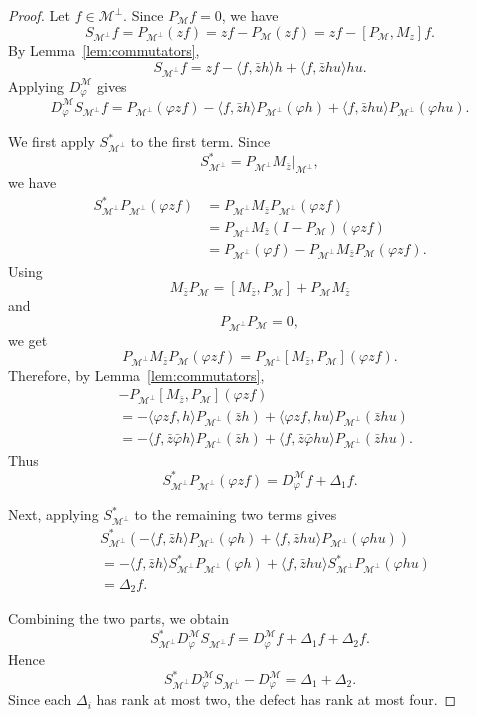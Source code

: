 \documentclass[12pt]{amsart}
\theoremstyle{definition}
\theoremstyle{remark}
\newcommand{\clm}{\mathcal{M}}
\newcommand{\vp}{\varphi}
\numberwithin{equation}{section}
\begin{document}
\begin{proof}
Let $f\in\clm^\perp$. Since $P_\clm f=0$, we have
\[
S_{\clm^\perp}f = P_{\clm^\perp}(zf)
= zf-P_\clm(zf) = zf-[P_\clm,M_z]f.
\]
By Lemma~\ref{lem:commutators},
\[
S_{\clm^\perp}f =
zf - \langle f,\bar{z} h\rangle h
+ \langle f,\bar{z} hu\rangle hu.
\]
Applying $D_\vp^\clm$ gives
\[
D_\vp^\clm S_{\clm^\perp}f
=
P_{\clm^\perp}(\vp zf)
-
\langle f,\bar{z} h\rangle P_{\clm^\perp}(\vp h)
+
\langle f,\bar{z} hu\rangle P_{\clm^\perp}(\vp hu).
\]

We first apply $S_{\clm^\perp}^*$ to the first term. Since
\[
S_{\clm^\perp}^*
=
P_{\clm^\perp}M_{\bar{z}}\big|_{\clm^\perp},
\]
we have
\begin{align*}
S_{\clm^\perp}^*P_{\clm^\perp}(\vp zf)
&=
P_{\clm^\perp}M_{\bar{z}}P_{\clm^\perp}(\vp zf) \\
&=
P_{\clm^\perp}M_{\bar{z}}(I-P_\clm)(\vp zf) \\
&=
P_{\clm^\perp}(\vp f)
-
P_{\clm^\perp}M_{\bar{z}}P_\clm(\vp zf).
\end{align*}
Using
\[
M_{\bar{z}}P_\clm
=
[M_{\bar{z}},P_\clm]+P_\clm M_{\bar{z}}
\]
and
\[
P_{\clm^\perp}P_\clm=0,
\]
we get
\[
P_{\clm^\perp}M_{\bar{z}}P_\clm(\vp zf)
=
P_{\clm^\perp}[M_{\bar{z}},P_\clm](\vp zf).
\]
Therefore, by Lemma~\ref{lem:commutators},
\begin{align*}
&-P_{\clm^\perp}[M_{\bar{z}},P_\clm](\vp zf) \\
&=
-
\langle \vp zf,h\rangle P_{\clm^\perp}(\bar{z} h)
+
\langle \vp zf,hu\rangle P_{\clm^\perp}(\bar{z} hu) \\
&=
-
\langle f,\bar{z}\bar\vp h\rangle P_{\clm^\perp}(\bar{z} h)
+
\langle f,\bar{z}\bar\vp hu\rangle P_{\clm^\perp}(\bar{z} hu).
\end{align*}
Thus
\[
S_{\clm^\perp}^*P_{\clm^\perp}(\vp zf) = D_\vp^\clm f+\Delta_1 f.
\]

Next, applying $S_{\clm^\perp}^*$ to the remaining two terms gives
\begin{align*}
& S_{\clm^\perp}^*
\left( -\langle f,\bar{z} h\rangle P_{\clm^\perp}(\vp h)
+ \langle f,\bar{z} hu\rangle P_{\clm^\perp}(\vp hu) \right) \\
&= -\langle f,\bar{z} h\rangle S_{\clm^\perp}^*P_{\clm^\perp}(\vp h)
+ \langle f,\bar{z} hu\rangle S_{\clm^\perp}^*P_{\clm^\perp}(\vp hu) \\
&= \Delta_2 f.
\end{align*}

Combining the two parts, we obtain
\[
S_{\clm^\perp}^*D_\vp^\clm S_{\clm^\perp}f
= D_\vp^\clm f+\Delta_1f+\Delta_2f.
\]
Hence
\[
S_{\clm^\perp}^*D_\vp^\clm S_{\clm^\perp}
- D_\vp^\clm = \Delta_1+\Delta_2.
\]
Since each $\Delta_i$ has rank at most two, the defect has rank at most four.
\end{proof}
\end{document}
